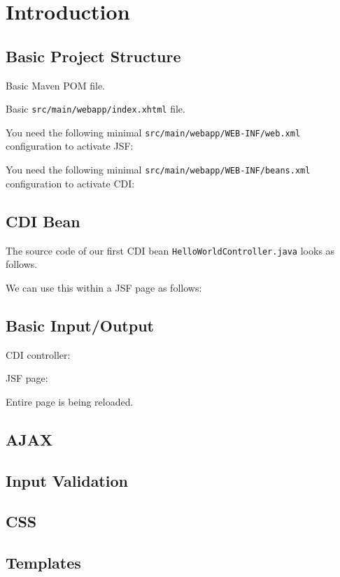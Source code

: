%

\chapter{Introduction}

\section{Basic Project Structure}
Basic Maven POM file.


Basic \texttt{src/main/webapp/index.xhtml} file.


You need the following minimal \texttt{src/main/webapp/WEB-INF/web.xml} configuration to activate JSF:


You need the following minimal \texttt{src/main/webapp/WEB-INF/beans.xml} configuration to activate CDI:


\section{CDI Bean}

The source code of our first CDI bean \texttt{HelloWorldController.java} looks as follows.


We can use this within a JSF page as follows:


\section{Basic Input/Output}

CDI controller:


JSF page:


Entire page is being reloaded.

\section{AJAX}



\section{Input Validation}



\section{CSS}

\section{Templates}